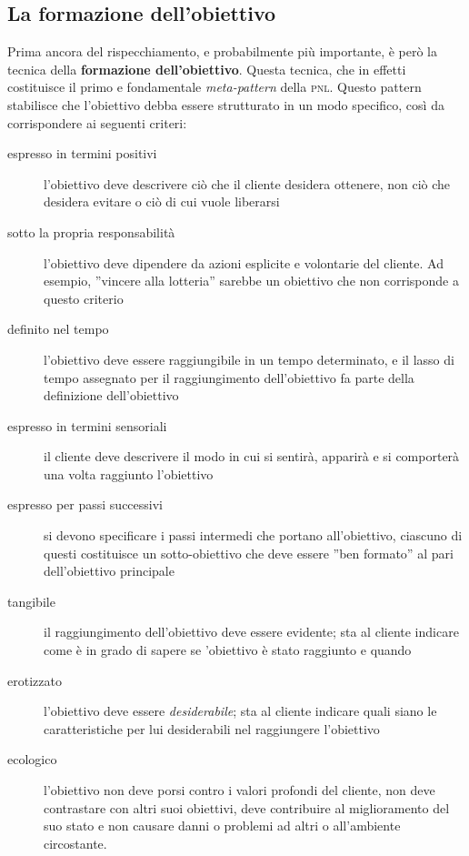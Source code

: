 \subsection{La formazione dell'obiettivo}
\label{sub:obiettivo}
%
Prima ancora del rispecchiamento, e probabilmente più importante, è però la tecnica della \textbf{formazione dell'obiettivo}. Questa tecnica, che in effetti costituisce il primo e fondamentale \emph{meta-pattern} della \textsc{pnl}\cite{magic}. Questo pattern stabilisce che l'obiettivo debba essere strutturato in un modo specifico, così da corrispondere ai seguenti criteri:
%
\begin{description}
\item [espresso in termini positivi] l'obiettivo deve descrivere ciò che il cliente desidera ottenere, non ciò che desidera evitare o ciò di cui vuole liberarsi
\item [sotto la propria responsabilità] l'obiettivo deve dipendere da azioni esplicite e volontarie del cliente. Ad esempio, ''vincere alla lotteria'' sarebbe un obiettivo che non corrisponde a questo criterio
\item [definito nel tempo] l'obiettivo deve essere raggiungibile in un tempo determinato, e il lasso di tempo assegnato per il raggiungimento dell'obiettivo fa parte della definizione dell'obiettivo
\item [espresso in termini sensoriali] il cliente deve descrivere il modo in cui si sentirà, apparirà e si comporterà una volta raggiunto l'obiettivo 
\item [espresso per passi successivi] si devono specificare i passi intermedi che portano all'obiettivo, ciascuno di questi costituisce un sotto-obiettivo che deve essere  ''ben formato'' al pari dell'obiettivo principale
\item [tangibile] il raggiungimento dell'obiettivo deve essere evidente; sta al cliente indicare come è in grado di sapere se 'obiettivo è stato raggiunto e quando
\item [erotizzato] l'obiettivo deve essere \emph{desiderabile}; sta al cliente indicare quali siano le caratteristiche per lui desiderabili nel raggiungere l'obiettivo
\item [ecologico] l'obiettivo non deve porsi contro i valori profondi del cliente, non deve contrastare con altri suoi obiettivi, deve contribuire al miglioramento del suo stato e non causare danni o problemi ad altri o all'ambiente circostante.
\end{description}

